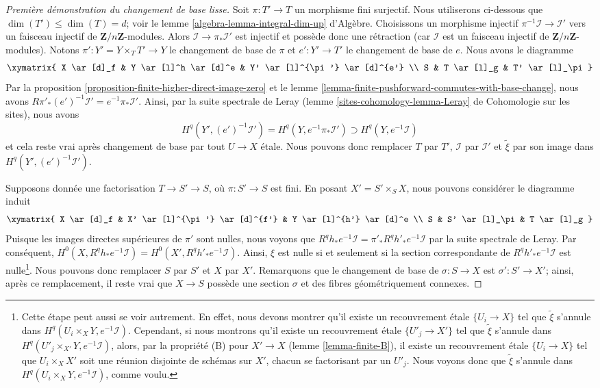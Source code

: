 \begin{proof}[Première démonstration du changement de base lisse]
\medskip\noindent
Soit $\pi : T' \to T$ un morphisme fini surjectif.
Nous utiliserons ci-dessous que $\dim(T') \leq \dim(T) = d$; voir le
lemme \ref{algebra-lemma-integral-dim-up} d'Algèbre.
Choisissons un morphisme injectif $\pi^{-1}\mathcal{I} \to \mathcal{I}'$
vers un faisceau injectif de $\mathbf{Z}/n\mathbf{Z}$-modules.
Alors $\mathcal{I} \to \pi_*\mathcal{I}'$ est injectif
et possède donc une rétraction (car $\mathcal{I}$ est un faisceau injectif
de $\mathbf{Z}/n\mathbf{Z}$-modules).
Notons $\pi' : Y' = Y \times_T T' \to Y$ le changement de base de $\pi$
et $e' : Y' \to T'$ le changement de base de $e$. Nous avons le diagramme
$$
\xymatrix{
X \ar[d]_f & Y \ar[l]^h \ar[d]^e & Y' \ar[l]^{\pi'} \ar[d]^{e'} \\
S & T \ar[l]_g & T' \ar[l]_\pi
}
$$
Par la proposition \ref{proposition-finite-higher-direct-image-zero} et le
lemme \ref{lemma-finite-pushforward-commutes-with-base-change}, nous avons
$R\pi'_*(e')^{-1}\mathcal{I}' = e^{-1}\pi_*\mathcal{I}'$.
Ainsi, par la suite spectrale de Leray
(lemme \ref{sites-cohomology-lemma-Leray} de Cohomologie sur les sites),
nous avons
$$
H^q(Y', (e')^{-1}\mathcal{I}') =
H^q(Y, e^{-1}\pi_*\mathcal{I}') \supset H^q(Y, e^{-1}\mathcal{I})
$$
et cela reste vrai après changement de base par tout $U \to X$ étale.
Nous pouvons donc remplacer $T$ par $T'$, $\mathcal{I}$ par $\mathcal{I}'$
et $\tilde \xi$ par son image dans $H^q(Y', (e')^{-1}\mathcal{I}')$.

\medskip\noindent
Supposons donnée une factorisation $T \to S' \to S$, où
$\pi : S' \to S$ est fini.
En posant $X' = S' \times_S X$, nous pouvons considérer le diagramme induit
$$
\xymatrix{
X \ar[d]_f & X' \ar[l]^{\pi'} \ar[d]^{f'} & Y \ar[l]^{h'} \ar[d]^e \\
S & S' \ar[l]_\pi & T \ar[l]_g
}
$$
Puisque les images directes supérieures de $\pi'$ sont nulles, nous voyons que
$R^qh_*e^{-1}\mathcal{I} = \pi'_*R^qh'_*e^{-1}\mathcal{I}$
par la suite spectrale de Leray. Par conséquent,
$H^0(X, R^qh_*e^{-1}\mathcal{I}) = H^0(X', R^qh'_*e^{-1}\mathcal{I})$.
Ainsi, $\xi$ est nulle si et seulement si la section correspondante de
$R^qh'_*e^{-1}\mathcal{I}$ est nulle\footnote{Cette
étape peut aussi se voir autrement. En effet, nous devons montrer
qu'il existe un recouvrement étale $\{U_i \to X\}$ tel que
$\tilde \xi$ s'annule dans $H^q(U_i \times_X Y, e^{-1}\mathcal{I})$.
Cependant, si nous montrons qu'il existe un recouvrement étale
$\{U'_j \to X'\}$ tel que $\tilde \xi$ s'annule dans
$H^q(U'_j \times_{X'} Y, e^{-1}\mathcal{I})$, alors, par la propriété (B)
pour $X' \to X$ (lemme \ref{lemma-finite-B}), il existe un recouvrement étale
$\{U_i \to X\}$ tel que $U_i \times_X X'$ soit une réunion disjointe
de schémas sur $X'$, chacun se factorisant par un $U'_j$.
Nous voyons donc que $\tilde \xi$ s'annule dans $H^q(U_i \times_X Y, e^{-1}\mathcal{I})$,
comme voulu.}.
Nous pouvons donc remplacer $S$ par $S'$ et $X$ par $X'$.
Remarquons que le changement de base de $\sigma : S \to X$ est $\sigma' : S' \to X'$;
ainsi, après ce remplacement, il reste vrai que $X \to S$
possède une section $\sigma$ et des fibres géométriquement connexes.


\end{proof}
